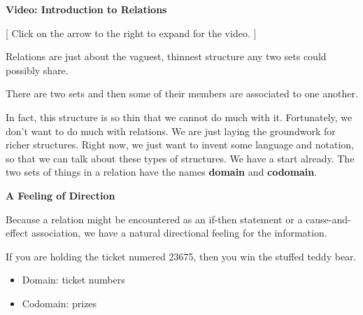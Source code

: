 \documentclass{ximera}
\begin{document}
\begin{explanation} \textbf{Video: Introduction to Relations}

[ Click on the arrow to the right to expand for the video. ]
\begin{expandable} 

\begin{center}
\end{center}

\end{expandable}
\end{explanation}





Relations are just about the vaguest, thinnest structure any two sets could possibly share. \\


\begin{center}
There are two sets and then some of their members are associated to one another. 
\end{center}


In fact, this structure is so thin that we cannot do much with it.  Fortunately, we don't want to do much with relations.  We are just laying the groundwork for richer structures.  Right now, we just want to invent some language and notation, so that we can talk about these types of structures. We have a start already. The two sets of things in a relation have the names \textbf{\textcolor{purple!85!blue}{domain}} and \textbf{\textcolor{purple!85!blue}{codomain}}.




\textbf{\textcolor{red!80!black}{A Feeling of Direction}}



Because a relation might be encountered as an if-then statement or a cause-and-effect association, we have a natural directional feeling for the information.  



\begin{idea}
If you are holding the ticket numered 23675, then you win the stuffed teddy bear. \\

\begin{itemize}
    \item Domain: ticket numbers
    \item Codomain: prizes
\end{itemize}

\end{idea}
\end{document}
